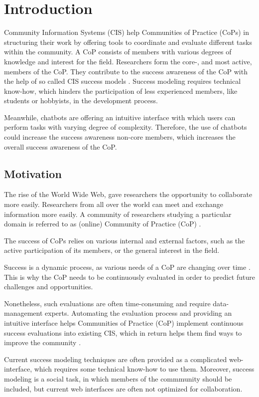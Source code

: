 \chapter{Introduction}
Community Information Systems (CIS) help Communities of Practice (CoPs) in structuring their work by offering tools to coordinate and evaluate different tasks within the community.
A CoP consists of members with various degrees of knowledge and interest for the field.
Researchers form the core-, and most active, members of the CoP.
They contribute to the success awareness of the CoP with the help of so called CIS success models \cite{Klam10c}.
Success modeling requires technical know-how, which hinders the participation of less experienced members, like students or hobbyists, in the development process.

Meanwhile, chatbots are offering an intuitive interface with which users can perform tasks with varying degree of complexity. Therefore, the use of chatbots could increase the success awareness non-core members, which increases the overall success awareness of the CoP.

\section{Motivation}
The rise of the World Wide Web, gave researchers the opportunity to collaborate more easily. Researchers from all over the world can meet and exchange information more easily. A community of researchers studying a particular domain is referred to as (online) Community of Practice (CoP) \cite{Renz08}.

The success of CoPs relies on various internal and external factors, such as the active participation of its members, or the general interest in the field.

Success is a dynamic process, as various needs of a CoP are changing over time \cite{Renz08,GKJa08}.
This is why the CoP needs to be continuously evaluated in order to predict future challenges and opportunities.

Nonetheless, such evaluations are often time-consuming and require data-management experts.
Automating the evaluation process and providing an intuitive interface helps Communities of Practice (CoP) implement continuous success evaluations into  existing CIS, which in return helps them find ways to improve the community \cite{Renz08}.

Current success modeling techniques are often provided as a complicated web-interface, which requires some technical know-how to use them.
Moreover, success modeling is a social task, in which members of the commmunity should be included, but current web interfaces are often not optimized for collaboration.

